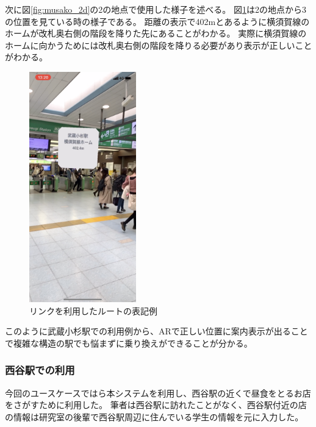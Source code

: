 次に図\ref{fig:musako_2d}の\textcircled{\scriptsize{2}}の地点で使用した様子を述べる。
図\ref{fig:musako_jr_ar1}は\textcircled{\scriptsize{2}}の地点から\textcircled{\scriptsize{3}}の位置を見ている時の様子である。
距離の表示で402mとあるように横須賀線のホームが改札奥右側の階段を降りた先にあることがわかる。
実際に横須賀線のホームに向かうためには改札奥右側の階段を降りる必要があり表示が正しいことがわかる。

\begin{figure}[h]
  \centering
  \includegraphics[height=100mm]{images/musako_jr_ar1.png}
  \caption{リンクを利用したルートの表記例} \label{fig:musako_jr_ar1}
\end{figure}
このように武蔵小杉駅での利用例から、ARで正しい位置に案内表示が出ることで複雑な構造の駅でも悩まずに乗り換えができることが分かる。


\subsubsection{西谷駅での利用}
今回のユースケースではら本システムを利用し、西谷駅の近くで昼食をとるお店をさがすために利用した。
筆者は西谷駅に訪れたことがなく、西谷駅付近の店の情報は研究室の後輩で西谷駅周辺に住んでいる学生の情報を元に入力した。

